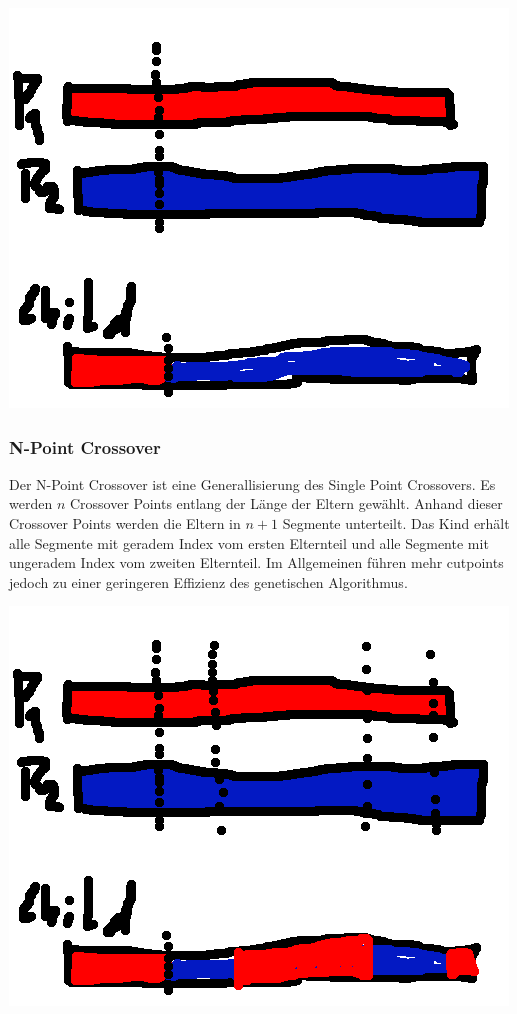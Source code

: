 \includegraphics[scale=1.0]{images/Single_Point_Crossover.png}

\subsubsection*{N-Point Crossover}
Der N-Point Crossover ist eine Generallisierung des Single Point Crossovers. Es werden $n$ Crossover Points entlang der Länge der Eltern gewählt. Anhand dieser Crossover Points werden die Eltern in $n+1$ Segmente unterteilt. Das Kind erhält alle Segmente mit geradem Index vom ersten Elternteil und alle Segmente mit ungeradem Index vom zweiten Elternteil. Im Allgemeinen führen mehr cutpoints jedoch zu einer geringeren Effizienz  des genetischen Algorithmus.~\cite*{TerminologiesAndOperators}

\includegraphics[scale=1.0]{images/N_Point_Crossover.png}

